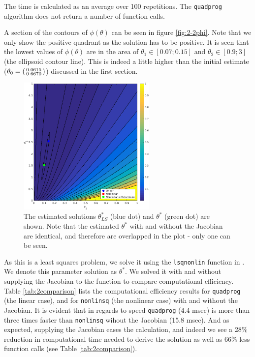 \begin{table}[htb]
\centering
\small

\caption{The time is calculated as an average over 100 repetitions. The \texttt{quadprog} algorithm does not return a number of function calls.}
\label{tab:2comparison}
\end{table}

A section of the contours of $\phi(\theta)$ can be seen in figure \ref{fig:2-2phi}. Note that we only show the positive quadrant as the solution has to be positive. It is seen that the lowest values of $\phi(\theta)$ are in the area of $\theta_1 \in [0.07; 0.15]$ and $\theta_2 \in [0.9; 3]$ (the ellipsoid contour line). This is indeed a little higher than the initial estimate ($\theta_0 = \begin{psmallmatrix}
0.0615 \\ 0.6670
\end{psmallmatrix}$) discussed in the first section. 

\begin{figure}[htb]
\centering
\includegraphics[width=0.6\textwidth]{../img/2-2phiPoints}
\caption{The estimated solutions $\theta^{*}_{LS}$ (blue dot) and $\theta^{*}$ (green dot) are shown. Note that the estimated $\theta^{*}$ with and without the Jacobian are identical, and therefore are overlapped in the plot - only one can be seen.}
\label{fig:2-2phiPoints}
\end{figure}

As this is a least squares problem, we solve it using the \texttt{lsqnonlin} function in \matlab. We denote this parameter solution as $\theta^*$. We solved it with and without supplying the Jacobian to the function to compare computational efficiency. Table \ref{tab:2comparison} lists the computational efficiency results for \texttt{quadprog} (the linear case), and for \texttt{nonlinsq} (the nonlinear case) with and without the Jacobian. It is evident that in regards to speed \texttt{quadprog} (4.4 msec) is more than three times faster than \texttt{nonlinsq} wihout the Jacobian (15.8 msec). And as expected, supplying the Jacobian eases the calculation, and indeed we see a 28\% reduction in computational time needed to derive the solution as well as 66\% less function calls (see Table \ref{tab:2comparison}). 



